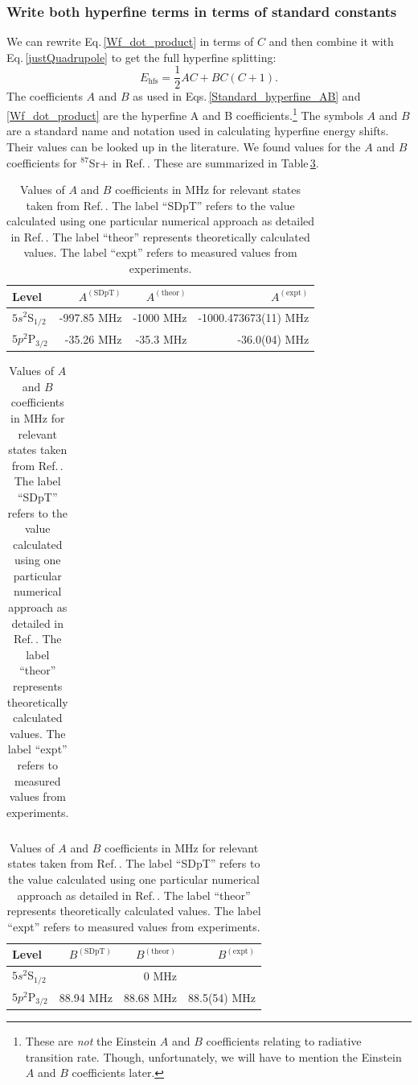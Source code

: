 \subsubsection{Write both hyperfine terms in terms of standard constants}
We can rewrite Eq.\,\eqref{Wf_dot_product} in terms of $C$ 
and then combine it with Eq.\,\eqref{justQuadrupole} to get the full hyperfine splitting\cite{cuaMITnotes}: 
\begin{equation}\label{Standard_hyperfine_AB}
E_{\mathrm{hfs}}=\frac{1}{2}AC+BC(C+1).
\end{equation}
The coefficients $A$ and $B$ as used in Eqs.\,\ref{Standard_hyperfine_AB} and \ref{Wf_dot_product} are the hyperfine A and B coefficients.\footnote{These are \emph{not} the Einstein $A$ and $B$ coefficients relating to radiative transition rate. Though, unfortunately, we will have to mention the Einstein $A$ and $B$ coefficients later.} The symbols $A$ and $B$ are a standard name and notation used in calculating hyperfine energy shifts. Their values can be looked up in the literature\cite{cuaMITnotes}.  We found values for the $A$ and $B$ coefficients for $^{87}$Sr+ in Ref.\,\cite{safronova2photon}. These are summarized in Table\,\ref{AB_table}.  

\begin{table}[h]
\centering
\begin{tabular}{|l|r|r|r|}
\hline
Level &  $A^{\mathrm{(SDpT)}}$ &$A^{\mathrm{(theor)}}$ & $A^{\mathrm{(expt)}}$ \\ \hline \hline
$5s ^2$S$_{1/2}$&-997.85 MHz& -1000 MHz& -1000.473673(11) MHz\\ \hline
$5p ^2$P$_{3/2}$&-35.26 MHz&-35.3 MHz&-36.0(04) MHz\\ \hline
\end{tabular}

\begin{tabular}{l}
\end{tabular}

\begin{tabular}{|l|r|r|r|}
\hline
Level &  $B^{\mathrm{(SDpT)}}$ &$B^{\mathrm{(theor)}}$ & $B^{\mathrm{(expt)}}$ \\ \hline \hline
$5s ^2$S$_{1/2}$&&0  MHz&  \\ \hline
$5p ^2$P$_{3/2}$&88.94 MHz&$88.68$ MHz\footnotemark&88.5(54) MHz \\ \hline
\end{tabular}
\caption{Values of $A$ and $B$ coefficients in MHz for relevant states taken from Ref.\,\cite{safronova2photon}. The label ``SDpT'' refers to the value calculated using one particular numerical approach as detailed in Ref.\,\cite{safronova2photon}. The label ``theor'' represents theoretically calculated values. The label ``expt'' refers to measured values from experiments.\label{AB_table}
}
\end{table}


